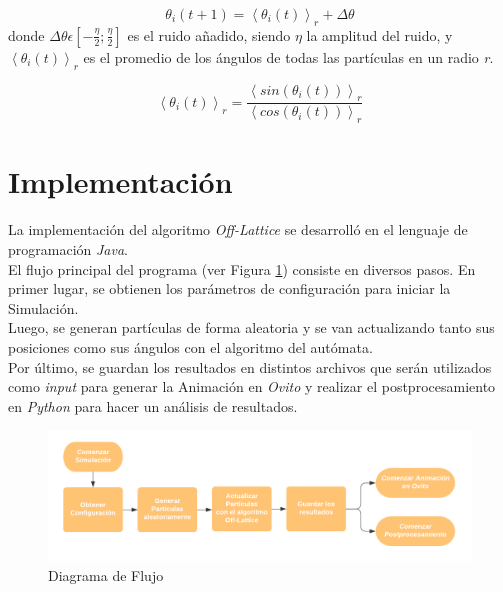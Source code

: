 \documentclass[12pt, a4paper]{report}
\begin{document}
\begin{equation}
\label{eq:angle}
\theta _i(t+1) = \left\langle \theta _i(t)\right\rangle _r + \Delta \theta 
\end{equation}
donde $\Delta \theta  \epsilon  [-\frac{\eta}{2}; \frac{\eta}{2}]$ es el ruido añadido, siendo $\eta$ la amplitud del ruido, y \emph{$\left\langle \theta _i(t)\right\rangle _r$} es el promedio de los ángulos de todas las partículas en un radio \emph{r}.

\begin{equation}
\label{eq:avgangle}
\left\langle \theta _i(t)\right\rangle _r =  \frac{\left\langle sin(\theta _i(t))\right\rangle _r}{\left\langle cos(\theta _i(t))\right\rangle _r} 
\end{equation}

\section{Implementación}
La implementación del algoritmo \emph{Off-Lattice} se desarrolló en el lenguaje de programación \emph{Java}.\\

El flujo principal del programa (ver Figura \ref{fig:diagrama_flujo}) consiste en diversos pasos. En primer lugar, se obtienen los parámetros de configuración para iniciar la Simulación.\\

Luego, se generan partículas de forma aleatoria y se van actualizando tanto sus posiciones como sus ángulos con el algoritmo del autómata. \\

Por último, se guardan los resultados en distintos archivos que serán utilizados como \emph{input} para generar la Animación en \emph{Ovito} y realizar el postprocesamiento en \emph{Python} para hacer un análisis de resultados.\\

\begin{figure}[h]
\includegraphics[scale=0.35]{Diagrama de flujo.png}
\centering 
\caption{Diagrama de Flujo}
\label{fig:diagrama_flujo}
\end{figure}
\end{document}
